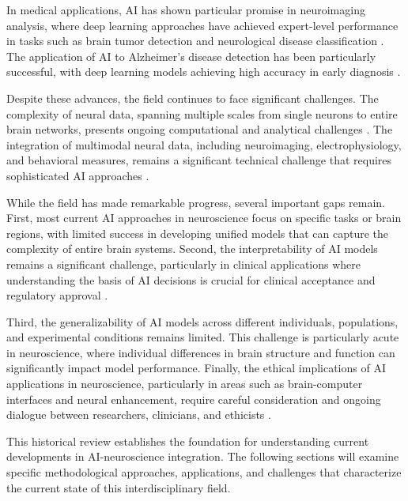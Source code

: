 \documentclass[conference]{IEEEtran}
\begin{document}
In medical applications, AI has shown particular promise in neuroimaging analysis, where deep learning approaches have achieved expert-level performance in tasks such as brain tumor detection and neurological disease classification \citep{hechkelEarlyDetectionClassification2025}. The application of AI to Alzheimer's disease detection has been particularly successful, with deep learning models achieving high accuracy in early diagnosis \citep{shamratAlzheimerNetEffectiveDeep2023}.

Despite these advances, the field continues to face significant challenges. The complexity of neural data, spanning multiple scales from single neurons to entire brain networks, presents ongoing computational and analytical challenges \citep{onciulArtificialIntelligenceNeuroscience2025}. The integration of multimodal neural data, including neuroimaging, electrophysiology, and behavioral measures, remains a significant technical challenge that requires sophisticated AI approaches \citep{lorenziIntegrationMultimodalData2023}.

While the field has made remarkable progress, several important gaps remain. First, most current AI approaches in neuroscience focus on specific tasks or brain regions, with limited success in developing unified models that can capture the complexity of entire brain systems. Second, the interpretability of AI models remains a significant challenge, particularly in clinical applications where understanding the basis of AI decisions is crucial for clinical acceptance and regulatory approval \citep{sadeghiReviewExplainableArtificial2024}.

Third, the generalizability of AI models across different individuals, populations, and experimental conditions remains limited. This challenge is particularly acute in neuroscience, where individual differences in brain structure and function can significantly impact model performance. Finally, the ethical implications of AI applications in neuroscience, particularly in areas such as brain-computer interfaces and neural enhancement, require careful consideration and ongoing dialogue between researchers, clinicians, and ethicists \citep{gordonEthicalConsiderationsUse2024}.

This historical review establishes the foundation for understanding current developments in AI-neuroscience integration. The following sections will examine specific methodological approaches, applications, and challenges that characterize the current state of this interdisciplinary field.
\end{document}
